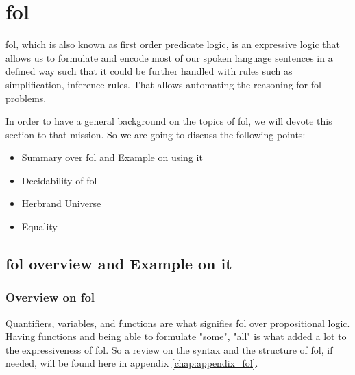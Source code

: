 \section{\acf{fol}} \label{sec:c2s1}

\ac{fol}, which is also known as first order predicate logic, is an expressive logic that allows us to formulate and encode most of our spoken language sentences in a defined way such that it could be further handled with rules such as simplification, inference rules. That allows automating the reasoning for \ac{fol} problems.


In order to have a general background on the topics of \ac{fol}, we will devote this section to that mission. So we are going to discuss the following points:
	
	\begin{itemize}
		\item Summary over \ac{fol} and Example on using it
		\item Decidability of \ac{fol}
		\item Herbrand Universe
		\item Equality
	\end{itemize}	    

\begin{comment}
	We could represent formulas in \ac{fol} in so many forms. So \ref{sub:c2s1s1} will be devoted to that part of background.
\end{comment}



\subsection{\ac{fol} overview and Example on it}

\subsubsection{Overview on \ac{fol}}
Quantifiers, variables, and functions are what signifies \ac{fol} over propositional logic. Having functions and being able to formulate "some", "all" is what added a lot to the expressiveness of \ac{fol}. So a review on the syntax and the structure of \ac{fol}, if needed, will be found here in appendix \ref{chap:appendix_fol}.


